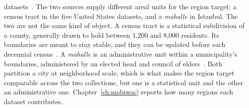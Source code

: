 datasets~\cite{wongso2025massivesteps}. The two sources supply different areal units
for the region target: a census tract in the five United States datasets, and a
\emph{mahalle} in Istanbul. The two are not the same kind of object. A census tract is a
statistical subdivision of a county, generally drawn to hold between 1,200 and 8,000
residents. Its boundaries are meant to stay stable, and they can be updated before each
decennial census~\cite{census2026glossary,census2018tracts}. A \emph{mahalle} is an
administrative unit within a municipality's boundaries, administered by an elected head
and council of elders~\cite{turkey2005law5393,turkey1984law2972}. Both partition a city at
neighborhood scale, which is what makes the region target comparable across the two
collections, but one is a statistical unit and the other an administrative one.
Chapter~\ref{ch:mobiwac} reports how many regions each dataset contributes.
